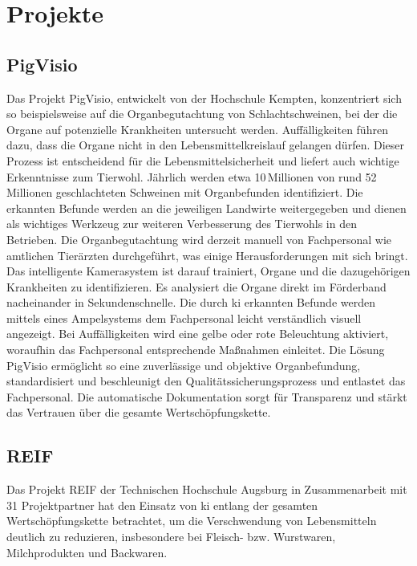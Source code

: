 \section{Projekte}
\subsection{PigVisio}
Das Projekt PigVisio, entwickelt von der Hochschule Kempten, konzentriert sich so beispielsweise auf die Organbegutachtung von Schlachtschweinen, bei der die Organe auf potenzielle Krankheiten untersucht werden. Auffälligkeiten führen dazu, dass die Organe nicht in den Lebensmittelkreislauf gelangen dürfen. Dieser Prozess ist entscheidend für die Lebensmittelsicherheit und liefert auch wichtige Erkenntnisse zum Tierwohl. Jährlich werden etwa 10\,Millionen von rund 52\,Millionen geschlachteten Schweinen mit Organbefunden identifiziert. Die erkannten Befunde werden an die jeweiligen Landwirte weitergegeben und dienen als wichtiges Werkzeug zur weiteren Verbesserung des Tierwohls in den Betrieben. Die Organbegutachtung wird derzeit manuell von Fachpersonal wie amtlichen Tierärzten durchgeführt, was einige Herausforderungen mit sich bringt. Das intelligente Kamerasystem ist darauf trainiert, Organe und die dazugehörigen Krankheiten zu identifizieren. Es analysiert die Organe direkt im Förderband nacheinander in Sekundenschnelle. Die durch \ac{ki} erkannten Befunde werden mittels eines Ampelsystems dem Fachpersonal leicht verständlich visuell angezeigt. Bei Auffälligkeiten wird eine gelbe oder rote Beleuchtung aktiviert, woraufhin das Fachpersonal entsprechende Maßnahmen einleitet. Die Lösung PigVisio ermöglicht so eine zuverlässige und objektive Organbefundung, standardisiert und beschleunigt den Qualitätssicherungsprozess und entlastet das Fachpersonal. Die automatische Dokumentation sorgt für Transparenz und stärkt das Vertrauen über die gesamte Wertschöpfungskette. \cite{Visionpier.}

\subsection{REIF}
Das Projekt REIF der Technischen Hochschule Augsburg in Zusammenarbeit mit 31 Projektpartner hat den Einsatz von \ac{ki} entlang der gesamten Wertschöpfungskette betrachtet, um die Verschwendung von Lebensmitteln deutlich zu reduzieren, insbesondere bei Fleisch- bzw. Wurstwaren, Milchprodukten und Backwaren.  
